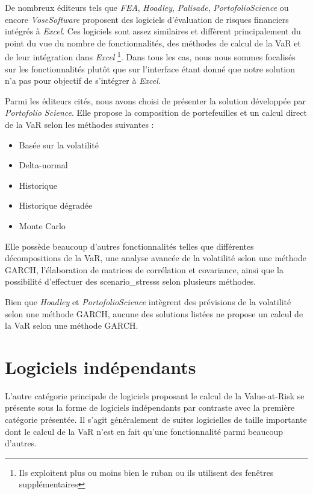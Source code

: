 		De nombreux éditeurs tels que \textit{FEA}, \textit{Hoadley}, \textit{Palisade}, \textit{PortofolioScience} ou encore \textit{VoseSoftware} proposent des logiciels d'évaluation de risques financiers intégrés à \textit{Excel}. Ces logiciels sont assez similaires et diffèrent principalement du point du vue du nombre de fonctionnalités, des méthodes de calcul de la VaR et de leur intégration dans \textit{Excel} \footnote{Ils exploitent plus ou moins bien le \gls{ruban} ou ils utilisent des fenêtres supplémentaires}. Dans tous les cas, nous nous sommes focalisés sur les fonctionnalités plutôt que sur l'interface étant donné que notre solution n'a pas pour objectif de s'intégrer à \textit{Excel}.
		\nocite{website:FEA}
		\nocite{website:Hoadley}
		\nocite{website:Palisade}
		\nocite{website:PortofolioScience}
		\nocite{website:VoseSoftware}

		Parmi les éditeurs cités, nous avons choisi de présenter la solution développée par \textit{Portofolio Science}. Elle propose la composition de portefeuilles et un calcul direct de la VaR selon les méthodes suivantes :
		\begin{itemize}
			\item Basée sur la volatilité
			\item Delta-normal
			\item Historique
			\item Historique dégradée
			\item Monte Carlo
		\end{itemize}

		Elle possède beaucoup d'autres fonctionnalités telles que différentes décompositions de la VaR, une analyse avancée de la volatilité selon une méthode GARCH, l'élaboration de matrices de corrélation et covariance, ainsi que la possibilité d'effectuer des \glspl{scenario_stress} selon plusieurs méthodes. 

		Bien que \textit{Hoadley} et \textit{PortofolioScience} intègrent des prévisions de la volatilité selon une méthode GARCH, aucune des solutions listées ne propose un calcul de la VaR selon une méthode GARCH.


	\section{Logiciels indépendants}

		L'autre catégorie principale de logiciels proposant le calcul de la Value-at-Risk se présente sous la forme de logiciels indépendants par contraste avec la première catégorie présentée. Il s'agit généralement de suites logicielles de taille importante dont le calcul de la VaR n'est en fait qu'une fonctionnalité parmi beaucoup d'autres.

